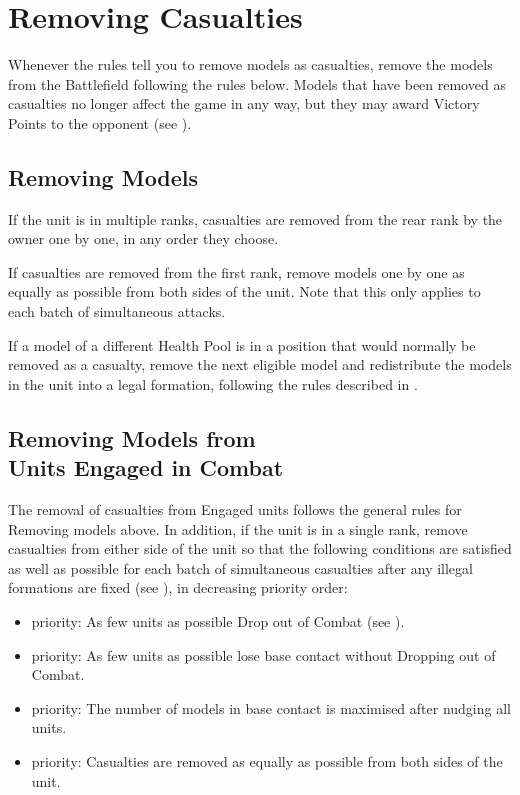 \columnbreak

\section{Removing Casualties}
\label{removing_casualties}

Whenever the rules tell you to remove models as casualties, remove the models from the Battlefield following the rules below. Models that have been removed as casualties no longer affect the game in any way, but they may award Victory Points to the opponent (see ).

\subsection{Removing \rnf{} Models}

If the unit is in multiple ranks, \rnf{} casualties are removed from the rear rank by the owner one by one, in any order they choose.

If casualties are removed from the first rank, remove models one by one as equally as possible from both sides of the unit. Note that this only applies to each batch of simultaneous attacks.

If a model of a different Health Pool is in a position that would normally be removed as a casualty, remove the next eligible \rnf{} model and redistribute the models in the unit into a legal formation, following the rules described in .

\subsection[Removing \rnf{} Models from Units Engaged in Combat]{Removing \rnf{} Models from\\ Units Engaged in Combat}

The removal of casualties from Engaged units follows the general rules for Removing \rnf{} models above. In addition, if the unit is in a single rank, remove casualties from either side of the unit so that the following conditions are satisfied as well as possible for each batch of simultaneous casualties after any illegal formations are fixed (see ), in decreasing priority order:
\begin{itemize}
	\item {} priority: As few units as possible Drop out of Combat (see ).
	\item {} priority: As few units as possible lose base contact without Dropping out of Combat.
	\item {} priority: The number of models in base contact is maximised after nudging all units.
	\item {} priority: Casualties are removed as equally as possible from both sides of the unit.
\end{itemize}

